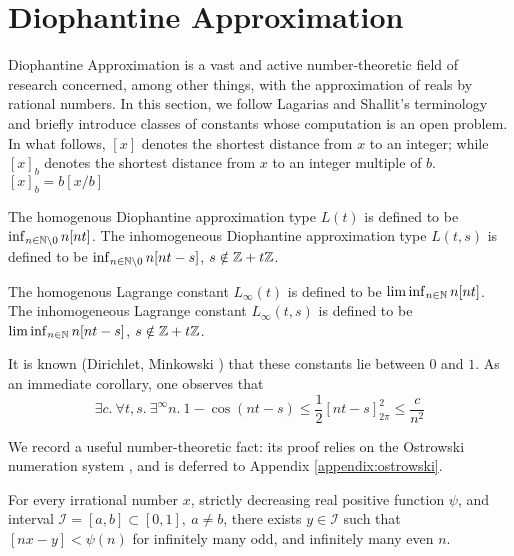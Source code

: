 \section{Diophantine Approximation}
\label{section:diophantine}

Diophantine Approximation is a vast and active number-theoretic field of research concerned, among other things, with the approximation of reals by rational numbers. In this section, we follow Lagarias and Shallit’s terminology \cite{dio-constants} and briefly introduce classes of constants whose computation is an open problem. In what follows, $[x]$ denotes the shortest distance from $x$ to an integer; while $[x]_b$ denotes the shortest distance from $x$ to an integer multiple of $b$. $[x]_b = b[x/b]$

\begin{definition}
\label{def:L}
The homogenous Diophantine approximation type $L(t)$ is defined to be $\inf_{n \in \mathbb{N} \backslash{0}} n[nt]$. The inhomogeneous Diophantine approximation type $L(t, s)$ is defined to be $\inf_{n \in \mathbb{N} \backslash{0}} n[nt - s]$, $s \notin \mathbb{Z} + t\mathbb{Z}$. 
\end{definition} 

\begin{definition}
\label{def:Linfty}
The homogenous Lagrange constant $L_\infty(t)$ is defined to be $\liminf_{n \in \mathbb{N}} n[nt]$. The inhomogeneous Lagrange constant $L_\infty(t, s)$ is defined to be\\ $\liminf_{n \in \mathbb{N}} n[nt - s]$, $s \notin \mathbb{Z} + t\mathbb{Z}$.
\end{definition} 

It is known (Dirichlet, Minkowski \cite{minkowski}) that these constants lie between $0$ and $1$. As an immediate corollary, one observes that
\begin{equation}
\label{eq:quadraticdecay}
\exists c.~\forall t, s.~ \exists^\infty n. ~ 1 - \cos(nt - s) \le \frac{1}{2}\left[nt - s \right]_{2\pi}^2 \le \frac{c}{n^2}
\end{equation}

We record a useful number-theoretic fact: its proof relies on the Ostrowski numeration system \cite{bourla2016ostrowski,berthe2022dynamics}, and is deferred to Appendix \ref{appendix:ostrowski}.
\begin{lemma}
\label{lemma:existsreal}
For every irrational number $x$, strictly decreasing real positive function $\psi$, and interval $\mathcal{I} = [a, b] \subset [0, 1], ~ a \ne b$, there exists $y \in \mathcal{I}$ such that $[nx - y] < \psi(n)$ for infinitely many odd, and infinitely many even $n$.
\end{lemma}


